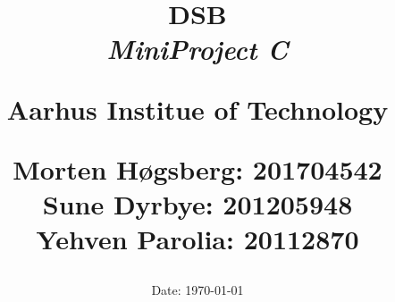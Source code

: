 \newcommand{\authorName}{}
\newcommand{\titleName}{DSB}
\newcommand{\subject}{MiniProject C}
\newcommand{\institute}{Aarhus Institue of Technology}
\begin{titlepage}
  \centering
    \title
    {
      \Huge \textbf{\titleName}\\
      \scale{\numberSQRTTWO}{\vspace{\sol pt}}
      \LARGE \textit{\subject}
      \scale{\numberSQRTTWO}{\rule{\linewidth}{\sol pt}}

      \textbf{\institute}
      
      \LARGE Morten Høgsberg: 201704542 \\ \LARGE Sune Dyrbye: 201205948 \\ \LARGE Yehven Parolia: 20112870
      \date{\LARGE Date: \today}
    }
\end{titlepage}

